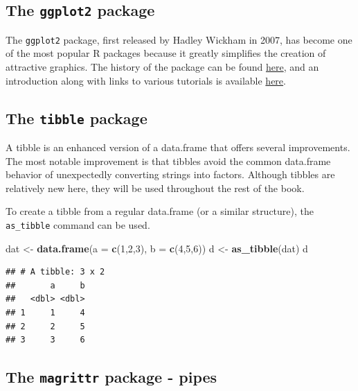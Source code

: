 \documentclass[
]{article}
\newenvironment{Shaded}{\begin{snugshade}}{\end{snugshade}}
\newcommand{\AttributeTok}[1]{\textcolor[rgb]{0.13,0.29,0.53}{#1}}
\newcommand{\DecValTok}[1]{\textcolor[rgb]{0.00,0.00,0.81}{#1}}
\newcommand{\FunctionTok}[1]{\textcolor[rgb]{0.13,0.29,0.53}{\textbf{#1}}}
\newcommand{\NormalTok}[1]{#1}
\newcommand{\OtherTok}[1]{\textcolor[rgb]{0.56,0.35,0.01}{#1}}
\begin{document}
\subsection{\texorpdfstring{The \texttt{ggplot2} package}{The ggplot2 package}}\label{the-ggplot2-package}

The \texttt{ggplot2} package, first released by Hadley Wickham in 2007, has become one of the most popular R packages because it greatly simplifies the creation of attractive graphics. The history of the package can be found \href{https://en.wikipedia.org/wiki/Ggplot2}{here}, and an introduction along with links to various tutorials is available \href{https://ggplot2.tidyverse.org/}{here}.

\subsection{\texorpdfstring{The \texttt{tibble} package}{The tibble package}}\label{the-tibble-package}

A tibble is an enhanced version of a data.frame that offers several improvements. The most notable improvement is that tibbles avoid the common data.frame behavior of unexpectedly converting strings into factors. Although tibbles are relatively new here, they will be used throughout the rest of the book.

To create a tibble from a regular data.frame (or a similar structure), the \texttt{as\_tibble} command can be used.

\begin{Shaded}
\begin{Highlighting}[]
\NormalTok{dat }\OtherTok{\textless{}{-}} \FunctionTok{data.frame}\NormalTok{(}\AttributeTok{a =} \FunctionTok{c}\NormalTok{(}\DecValTok{1}\NormalTok{,}\DecValTok{2}\NormalTok{,}\DecValTok{3}\NormalTok{), }\AttributeTok{b =} \FunctionTok{c}\NormalTok{(}\DecValTok{4}\NormalTok{,}\DecValTok{5}\NormalTok{,}\DecValTok{6}\NormalTok{))}
\NormalTok{d }\OtherTok{\textless{}{-}} \FunctionTok{as\_tibble}\NormalTok{(dat)}
\NormalTok{d}
\end{Highlighting}
\end{Shaded}

\begin{verbatim}
## # A tibble: 3 x 2
##       a     b
##   <dbl> <dbl>
## 1     1     4
## 2     2     5
## 3     3     6
\end{verbatim}

\subsection{\texorpdfstring{The \texttt{magrittr} package - pipes}{The magrittr package - pipes}}\label{the-magrittr-package---pipes}
\end{document}
